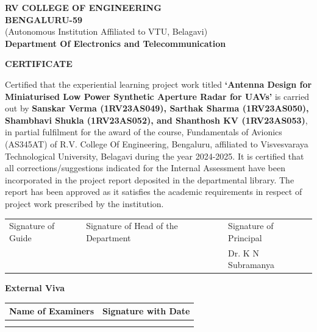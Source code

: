 \documentclass[12pt]{article}
\begin{document}
\newpage
\thispagestyle{empty}

\begin{center}
{\large \textbf{RV COLLEGE OF ENGINEERING}}\\
\vspace{0.25cm}
\textbf{BENGALURU-59}\\
\vspace{0.25cm}
{\small (Autonomous Institution Affiliated to VTU, Belagavi)}\\
\vspace{0.25cm}
{\large \textbf{Department Of Electronics and Telecommunication}}

\vspace{1cm}
{\Large \textbf{CERTIFICATE}}
\end{center}

\vspace{1cm}

Certified that the experiential learning project work titled \textbf{`Antenna Design for Miniaturised Low Power Synthetic Aperture Radar for UAVs'} is carried out by \textbf{Sanskar Verma (1RV23AS049), Sarthak Sharma (1RV23AS050), Shambhavi Shukla (1RV23AS052), and Shanthosh KV (1RV23AS053)}, in partial fulfilment for the award of the course, Fundamentals of Avionics (AS345AT) of R.V. College Of Engineering, Bengaluru, affiliated to Visvesvaraya Technological University, Belagavi during the year 2024-2025. It is certified that all corrections/suggestions indicated for the Internal Assessment have been incorporated in the project report deposited in the departmental library. The report has been approved as it satisfies the academic requirements in respect of project work prescribed by the institution.

\vspace{3cm}

\begin{tabular}{p{}p{}p{}}
Signature of Guide & Signature of Head of the Department & Signature of Principal \\
& & Dr. K N Subramanya \\
\end{tabular}

\vspace{2cm}

\textbf{External Viva}

\begin{tabular}{|p{}|p{}|}
\hline
Name of Examiners & Signature with Date \\
\hline
& \\
& \\
\hline
\end{tabular}
\end{document}
